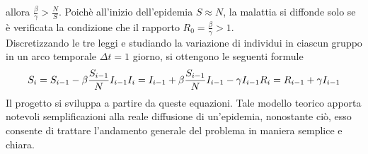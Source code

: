\documentclass[11pt, a4paper]{article} %
\begin{document}
allora $\frac{\beta}{\gamma}>\frac{N}{S}$. Poich\`{e} all'inizio dell'epidemia 
$S\approx N$, la malattia si diffonde solo se \`{e} verificata la condizione 
che il rapporto $R_0=\frac{\beta}{\gamma}>1$.\\
Discretizzando le tre leggi e studiando la variazione di individui in ciascun 
gruppo in un arco temporale $\Delta t=1$ giorno, si ottengono le seguenti formule
\begin{equation}  %
S_i = S_{i-1} - \beta \frac{S_{i-1}}{N} I_{i-1} \\
I_i = I_{i-1} + \beta \frac{S_{i-1}}{N} I_{i-1} - \gamma I_{i-1} \\
R_i = R_{i-1} + \gamma I_{i-1} 
\end{equation}
Il progetto si sviluppa a partire da queste equazioni.
Tale modello teorico apporta notevoli semplificazioni alla reale 
diffusione di un'epidemia, nonostante ci\`{o}, esso consente di trattare 
l'andamento generale del problema in maniera semplice e chiara.
\end{document}
